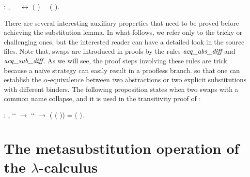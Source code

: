 \begin{coqdoccode}
\coqdocemptyline
\coqdocnoindent
{} : \coqdockw{\ensuremath{\forall}}    ,  =  \ensuremath{\leftrightarrow} (   ) = (   ).\coqdoceol
\coqdocemptyline
\coqdocemptyline
\end{coqdoccode}
There are several interesting auxiliary properties that need to be proved before achieving the substitution lemma. In what follows, we refer only to the tricky or challenging ones, but the interested reader can have a detailed look in the source files. Note that, swaps are introduced in proofs by the rules $\mbox{\it aeq}\_\mbox{\it abs}\_\mbox{\it diff}$ and $\mbox{\it aeq}\_\mbox{\it sub}\_\mbox{\it diff}$. As we will see, the proof steps involving these rules are trick because a naïve strategy can easily result in a proofless branch. so that one can establish the $\alpha$-equivalence between two abstractions or two explicit substitutions with different binders. The following proposition states when two swaps with a common name collapse, and it is used in the transitivity proof of : 
\begin{coqdoccode}
\coqdocemptyline
\coqdocnoindent
{} : \coqdockw{\ensuremath{\forall}}    ,  ``   \ensuremath{\rightarrow}  ``   \ensuremath{\rightarrow} (   (   )) = (   ).\coqdoceol
\coqdocemptyline
\end{coqdoccode}
\section{The metasubstitution operation of the $\lambda$-calculus}



